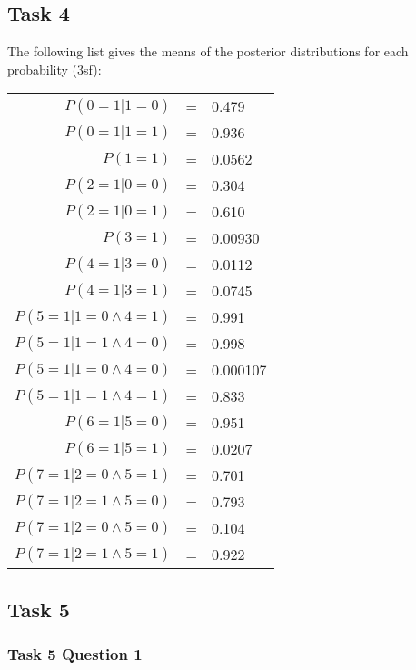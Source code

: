 \documentclass[a4paper,11pt]{article}
\begin{document}
\subsection{Task 4}

The following list gives the means of the posterior distributions for each probability (3sf):

\begin{center}
\begin{tabular}{r c l}
	$P(0=1|1=0)$					& = & 0.479 \\
	$P(0=1|1=1)$					& = & 0.936 \\
	$P(1=1)$						& = & 0.0562 \\
	$P(2=1|0=0)$					& = & 0.304 \\
	$P(2=1|0=1)$					& = & 0.610 \\
	$P(3=1)$						& = & 0.00930 \\
	$P(4=1|3=0)$					& = & 0.0112 \\
	$P(4=1|3=1)$					& = & 0.0745 \\
	$P(5=1|1=0\wedge{}4=1)$			& = & 0.991 \\
	$P(5=1|1=1\wedge{}4=0)$			& = & 0.998 \\
	$P(5=1|1=0\wedge{}4=0)$			& = & 0.000107 \\
	$P(5=1|1=1\wedge{}4=1)$			& = & 0.833 \\
	$P(6=1|5=0)$					& = & 0.951 \\
	$P(6=1|5=1)$					& = & 0.0207 \\
	$P(7=1|2=0\wedge{}5=1)$			& = & 0.701 \\
	$P(7=1|2=1\wedge{}5=0)$			& = & 0.793 \\
	$P(7=1|2=0\wedge{}5=0)$			& = & 0.104 \\
	$P(7=1|2=1\wedge{}5=1)$			& = & 0.922
\end{tabular}
\end{center}

\subsection{Task 5}
\subsubsection{Task 5 Question 1}
\end{document}
